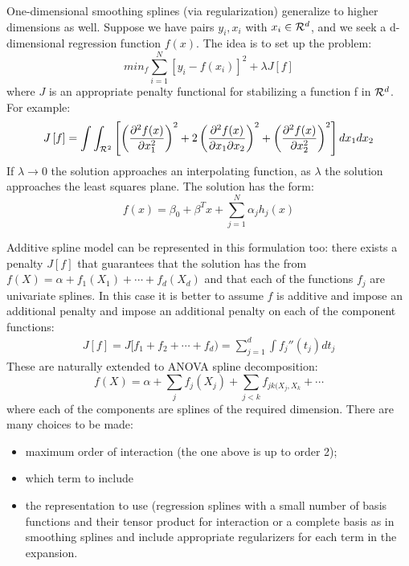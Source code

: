 \documentclass[12pt, letterpaper]{article}
\theoremstyle{definition}
\begin{document}
One-dimensional smoothing splines (via regularization) generalize to higher dimensions as well. Suppose we have pairs $y_i,x_i$ with $x_i \in \CMcal{R}^d$, and we seek a d-dimensional regression function $f(x)$. The idea is to set up the problem:
\begin{equation}
min_f \sum_{i=1}^N \left[y_i - f(x_i)\right]^2 +\lambda J\left[f\right]
\end{equation}
where $J$ is an appropriate penalty functional for stabilizing a function f in $\CMcal{R}^d$. For example:
\begin{equation}
 J\left[f\right] = \int \int_{\CMcal{R}^2} \left[ \left( \frac{\partial^2 f(x)}{\partial x_1^2} \right)^2+2\left(\frac{\partial^2 f(x)}{\partial x_1 \partial x_2} \right)^2+\left(\frac{\partial^2 f(x)}{\partial x_2^2} \right)^2\right]dx_1dx_2
\end{equation}
If $\lambda\rightarrow 0$ the solution approaches an interpolating function, as $\lambda$ the solution approaches the least squares plane.
The solution has the form:
\begin{equation}
f(x) = \beta_0 + \beta^T x + \sum^N_{j=1} \alpha_j h_j(x)
\end{equation}

Additive spline model can be represented in this formulation too: there exists a penalty $J[f]$ that guarantees that the solution has the from $f(X) = \alpha + f_1(X_1) +\cdots + f_d(X_d)$ and that each of the functions $f_j$ are univariate splines. In this case it is better to assume $f$ is additive and impose an additional penalty and impose an additional penalty on each of the component functions:
\begin{equation}
\begin{aligned}
J[f] = J[f_1+f_2+\cdots+f_d) =\sum_{j=1}^d \int f_j''(t_j)dt_j
\end{aligned}
\end{equation}
These are naturally extended to ANOVA spline decomposition:
\begin{equation}
f(X) = \alpha + \sum_j f_j(X_j) + \sum_{j<k} f_{jk(X_j, X_k}+ \cdots
\end{equation}
where each of the components are splines of the required dimension. There are many choices to be made:
\begin{itemize}
\item maximum order of interaction (the one above is up to order 2);
\item which term to include
\item the representation to use (regression splines with a small number of basis functions and their tensor product for interaction or a complete basis as in smoothing splines and include appropriate regularizers for each term in the expansion.
\end{itemize}
\end{document}
